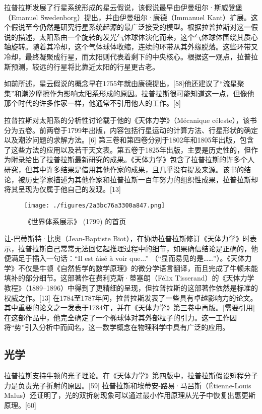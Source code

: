 拉普拉斯发展了行星系统形成的星云假说，该假说最早由伊曼纽尔·斯威登堡（Emanuel Swedenborg）提出，并由伊曼纽尔·康德（Immanuel Kant）扩展。这个假说至今仍然是研究行星系统起源的最广泛接受的模型。根据拉普拉斯对这一假说的描述，太阳系由一个旋转的发光气体球体演化而来，这个气体球体围绕其质心轴旋转。随着其冷却，这个气体球体收缩，连续的环带从其外缘脱落。这些环带又冷却，最终凝聚成行星，而太阳则代表着剩下的中央核心。根据这一观点，拉普拉斯预测，较远的行星将比靠近太阳的行星更古老。

如前所述，星云假说的概念早在1755年就由康德提出，[58]他还建议了“流星聚集”和潮汐摩擦作为影响太阳系形成的原因。拉普拉斯很可能知道这一点，但像他那个时代的许多作家一样，他通常不引用他人的工作。[8]

拉普拉斯对太阳系的分析性讨论载于他的《天体力学》（Mécanique céleste），该书分为五卷。前两卷于1799年出版，内容包括行星运动的计算方法、行星形状的确定以及潮汐问题的求解方法。[6] 第三卷和第四卷分别于1802年和1805年出版，包含了这些方法的应用以及若干天文表。第五卷于1825年出版，主要是历史性的，但作为附录给出了拉普拉斯最新研究的成果。《天体力学》包含了拉普拉斯的许多个人研究，但其中许多结果是借用其他作家的成果，且几乎没有提及来源。该书的结论，被历史学家描述为其他作家和拉普拉斯一百年努力的组织性成果，拉普拉斯却将其呈现为仅属于他自己的发现。[13]
\begin{figure}[ht]
\centering
\texttt{[image: ./figures/2a3bc76a3300a847.png]}
\caption{《世界体系展示》 (1799) 的首页} \label{fig_LPLS_12}
\end{figure}
让-巴蒂斯特·比奥（Jean-Baptiste Biot），在协助拉普拉斯修订《天体力学》时表示，拉普拉斯自己常常无法回忆起推理过程中的细节，如果确信结论是正确的，他便满足于插入一句话：“Il est àisé à voir que...” （“显而易见的是……”）。《天体力学》不仅是牛顿《自然哲学的数学原理》的微分学语言翻译，而且完成了牛顿未能填补的部分细节。这部著作在费利克斯·蒂塞朗（Félix Tisserand）的《天体力学教程》（1889–1896）中得到了更精细的呈现，但拉普拉斯的这部著作依然是标准的权威之作。[13] 在1784至1787年间，拉普拉斯发表了一些具有卓越影响力的论文。其中重要的论文之一发表于1784年，并在《天体力学》第三卷中再版。[需要引用] 在这部作品中，他完全确定了一个椭球体对其外部粒子的引力。这一工作因将“势”引入分析中而闻名，这一数学概念在物理科学中具有广泛的应用。
\subsection{光学}  
拉普拉斯支持牛顿的光子理论。在《天体力学》第四版中，拉普拉斯假设短程分子力是负责光子折射的原因。[59] 拉普拉斯和埃蒂安-路易·马吕斯（Étienne-Louis Malus）还证明了，光的双折射现象可以通过最小作用原理从光子中恢复出惠更斯原理。[60]

